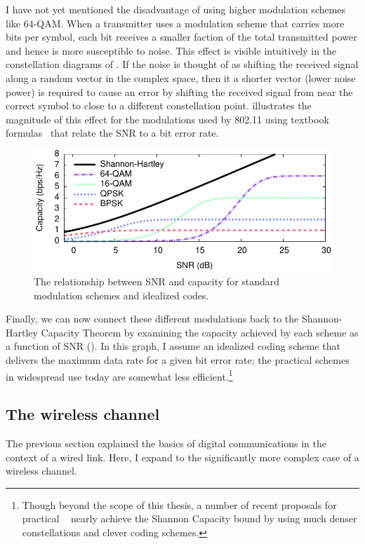I have not yet mentioned the disadvantage of using higher modulation schemes like 64-QAM\@. When a transmitter uses a modulation scheme that carries more bits per symbol, each bit receives a smaller faction of the total transmitted power and hence is more susceptible to noise. This effect is visible intuitively in the constellation diagrams of . If the noise is thought of as shifting the received signal along a random vector in the complex space, then it a shorter vector (lower noise power) is required to cause an error by shifting the received signal from near the correct symbol to close to a different constellation point.  illustrates the magnitude of this effect for the modulations used by 802.11 using textbook formulas~\cite{Sklar} that relate the SNR to a bit error rate.

\begin{figure}[t]
\centering
\includegraphics{calculations/snr_bits-crop}
\caption{\label{fig:mod_bits_snr}The relationship between SNR and capacity for standard modulation schemes and idealized codes.}
\end{figure}

Finally, we can now connect these different modulations back to the Shannon-Hartley Capacity Theorem by examining the capacity achieved by each scheme as a function of SNR (). In this graph, I assume an idealized coding scheme that delivers the maximum data rate for a given bit error rate; the practical schemes in widespread use today are somewhat less efficient.\footnote{Though beyond the scope of this thesis, a number of recent proposals for practical ~\cite{Gudipati_Strider,Perry_Spinal} nearly achieve the Shannon Capacity bound by using much denser constellations and clever coding schemes.}

\subsection{The wireless channel}
The previous section explained the basics of digital communications in the context of a wired link. Here, I expand to the significantly more complex case of a wireless channel.

